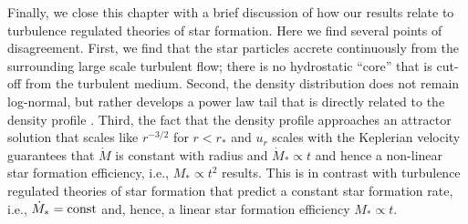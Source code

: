 \documentclass[../dissertation.tex]{subfiles}
\begin{document}
Finally, we close this chapter with a brief discussion of how our results relate to turbulence regulated theories of star formation. 
Here we find several points of disagreement. 
First, we find that the star 
particles accrete continuously from the surrounding large scale turbulent flow; there is 
no hydrostatic ``core'' that is cut-off from the turbulent medium. Second, 
the density distribution does not remain log-normal, but rather develops a power law tail that 
is directly related to the density profile \citep{2011ApJ...727L..20K,2015ApJ...800...49L}.  
Third, the fact that the density profile approaches an attractor solution that scales like 
$r^{-3/2}$ for $r<r_*$ and $u_r$ scales with the Keplerian velocity guarantees that $\dot{M}$ is 
constant with radius and $\dot{M}_*\propto t$ and hence a non-linear star formation efficiency, 
i.e., $M_* \propto t^2$ results. This is in contrast with turbulence regulated theories of star 
formation that predict a constant star formation rate, i.e., $\dot{M}_* = {\rm const}$ and, 
hence, a linear star formation efficiency $M_* \propto t$. 


%
%
%
%
%
\end{document}
